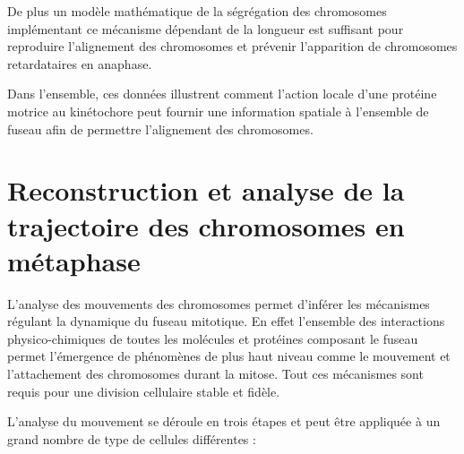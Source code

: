 \documentclass[12pt,a4paper,twoside,openright]{book}
\begin{document}
De plus un modèle mathématique de la ségrégation des chromosomes
implémentant ce mécanisme dépendant de la longueur est suffisant pour
reproduire l'alignement des chromosomes et prévenir l'apparition de
chromosomes retardataires en anaphase.

Dans l'ensemble, ces données illustrent comment l'action locale d'une
protéine motrice au kinétochore peut fournir une information spatiale à
l'ensemble de fuseau afin de permettre l'alignement des chromosomes.





\section{Reconstruction et analyse de la trajectoire des chromosomes en
métaphase}\label{reconstruction-et-analyse-de-la-trajectoire-des-chromosomes-en-muxe9taphase}

L'analyse des mouvements des chromosomes permet d'inférer les mécanismes
régulant la dynamique du fuseau mitotique. En effet l'ensemble des
interactions physico-chimiques de toutes les molécules et protéines
composant le fuseau permet l'émergence de phénomènes de plus haut niveau
comme le mouvement et l'attachement des chromosomes durant la mitose.
Tout ces mécanismes sont requis pour une division cellulaire stable et
fidèle.

L'analyse du mouvement se déroule en trois étapes et peut être appliquée
à un grand nombre de type de cellules différentes :
\end{document}
